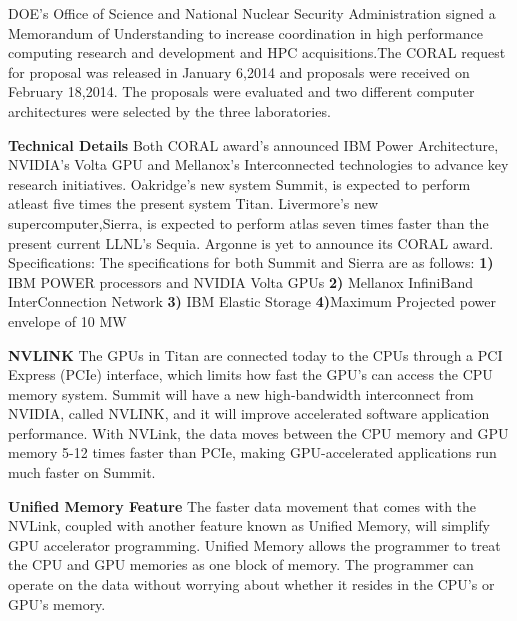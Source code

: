 \documentclass[fleqn,letterpaper,12pt]{report}
\begin{document}
DOE’s Office of Science and National Nuclear Security Administration signed a Memorandum of Understanding to increase coordination in high performance computing research and development and HPC acquisitions.The CORAL request for proposal was released in January 6,2014 and proposals were received on February 18,2014. The proposals were evaluated and two different computer architectures were selected by the three laboratories.\cite{DOE} \cite{IBM}

\textbf{Technical Details} \newline
Both CORAL award’s announced IBM Power Architecture, NVIDIA’s Volta GPU and Mellanox’s Interconnected technologies to advance key research initiatives. Oakridge’s new system Summit, is expected to perform atleast five times the present system Titan. Livermore’s new supercomputer,Sierra, is expected to perform atlas seven times faster than the present current LLNL’s Sequia.
Argonne is yet to announce its CORAL award.
\newpage
Specifications:\cite{Sierra}\newline
The specifications for both Summit and Sierra are as follows: \newline
\textbf{1)} IBM POWER processors and NVIDIA Volta GPUs \newline
\textbf{2)} Mellanox InfiniBand InterConnection Network \newline
\textbf{3)} IBM Elastic Storage \newline
\textbf{4)}Maximum Projected power envelope of 10 MW 

\textbf{NVLINK} \newline
The GPUs in Titan are connected today to the CPUs through a PCI Express (PCIe) interface, which limits how fast the GPU’s can access the CPU memory system. Summit will have a new high-bandwidth interconnect from NVIDIA, called NVLINK, and it will improve accelerated software application performance. With NVLink, the data moves between the CPU memory and GPU memory 5-12 times faster than PCIe, making GPU-accelerated applications run much faster on Summit. 

\textbf{Unified Memory Feature} \newline
The faster data movement that comes with the NVLink, coupled with another feature known as Unified Memory, will simplify GPU accelerator programming. Unified Memory allows the programmer to treat the CPU and GPU memories as one block of memory. The programmer can operate on the data without worrying about whether it resides in the CPU’s or GPU’s memory.
\end{document}
